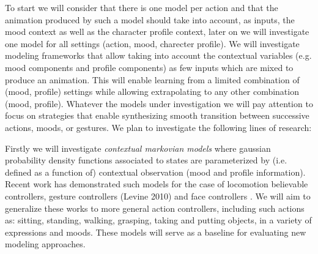 To start we will consider that there is one model per action and that the animation produced by such a model should take into account, as inputs, the mood context as well as the character profile context, later on we will investigate one model for all settings (action, mood, charecter profile). We will investigate modeling frameworks that allow taking into account the contextual variables (e.g. mood components and profile components) as few inputs which are mixed to produce an animation. This will enable learning from a limited combination of (mood, profile) settings while allowing extrapolating to any other combination (mood, profile). 
Whatever the models under investigation we will pay attention to focus on strategies that enable synthesizing smooth transition between successive actions, moods, or gestures. 
We plan to investigate the following lines of research:
 
  Firstly we will investigate {\it contextual markovian models} where gaussian probability density functions associated to states are parameterized by (i.e. defined as a function of) contextual observation (mood and profile information). Recent work has demonstrated such models for the case of locomotion believable controllers, gesture controllers (Levine 2010) and face controllers \cite{Radenen2014, Ding2013, Ding2014}. We will aim to generalize these works to more general action controllers, including such actions as: sitting, standing, walking, grasping, taking and putting objects, in a variety of expressions and moods. These models will serve as a baseline for evaluating new modeling approaches.

